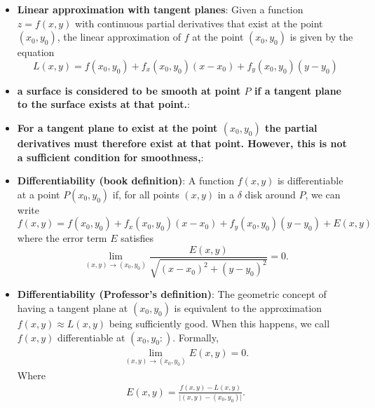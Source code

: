 \documentclass{report}
\begin{document}
\begin{itemize}
            \item \textbf{Linear approximation with tangent planes}: 
                Given a function \(z=f(x,y)\) with continuous partial derivatives that exist at the point \((x_0,y_0)\), the linear approximation of \(f\) at the point \((x_0,y_0)\) is given by the equation
                \[ L(x,y) = f(x_0,y_0) + f_x(x_0,y_0)(x-x_0) + f_y(x_0,y_0)(y-y_0) \]
            \item \textbf{a surface is considered to be smooth at point  $P$ if a tangent plane to the surface exists at that point.}:
            \item \textbf{For a tangent plane to exist at the point  $(x_{0}, y_{0})$ the partial derivatives must therefore exist at that point. However, this is not a sufficient condition for smoothness,}:
            \item \textbf{Differentiability (book definition)}: A function \(f(x,y)\) is differentiable at a point \(P(x_0,y_0)\) if, for all points \((x,y)\) in a \(\delta\) disk around \(P\), we can write
                \begin{equation}
                    f(x,y) = f(x_0,y_0) + f_x(x_0,y_0)(x-x_0) + f_y(x_0,y_0)(y-y_0) + E(x,y)
                \end{equation}
                where the error term \(E\) satisfies
                \[
                    \lim_{(x,y) \to (x_0,y_0)} \frac{E(x,y)}{\sqrt{(x-x_0)^2 + (y-y_0)^2}} = 0.
                \]
            \item \textbf{Differentiability (Professor's definition)}: The geometric concept of having a tangent plane at $(x_{0}, y_{0})$ is equivalent to the approximation $f(x,y) \approx L(x,y)$ being sufficiently good. When this happens, we call $f(x,y)$ differentiable at $(x_{0}, y_{0}:)$. Formally,
                \begin{align*}
                    \lim\limits_{(x,y) \to (x_{0}, y_{0})}{E(x,y)} = 0
                .\end{align*}
                Where 
                \begin{align*}
                    E(x,y) = \frac{f(x,y) - L(x,y)}{\bigg\lvert (x,y) - (x_{0}, y_{0}) \bigg\rvert}
                .\end{align*}


\end{itemize}
\end{document}

